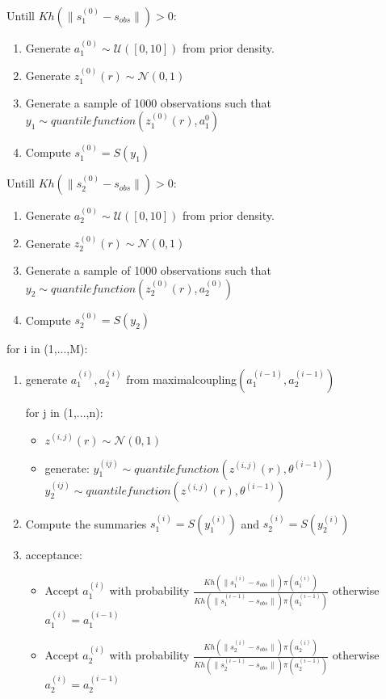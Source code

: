 \documentclass{article}
\begin{document}
Untill $Kh(\|s_{1}^{(0)} - s_{obs}\|)>0$:
\begin{enumerate}
	\item Generate $a_{1}^{(0)} \sim \mathcal{U}([0,10])$ from prior density.
	\item Generate $z_{1}^{(0)}(r) \sim \mathcal{N}(0,1)$
	\item Generate a sample of 1000 observations such that $y_{1} \sim quantile function(z_{1}^{(0)}(r),a_{1}^{0})$
	\item Compute $s_{1}^{(0)}=S(y_{1})$
	
\end{enumerate}
Untill $Kh(\|s_{2}^{(0)} - s_{obs}\|)>0$:
\begin{enumerate}
	\item Generate $a_{2}^{(0)} \sim \mathcal{U}([0,10])$ from prior density.
	\item Generate $z_{2}^{(0)}(r) \sim \mathcal{N}(0,1)$
	\item Generate a sample of 1000 observations such that $y_{2} \sim quantile function(z_{2}^{(0)}(r),a_{2}^{(0)})$
	\item Compute $s_{2}^{(0)}=S(y_{2})$
\end{enumerate}


for i in (1,...,M):
\begin{enumerate}
	\item 	generate $a_{1}^{(i)},a_{2}^{(i)}$  from maximalcoupling$(a_{1}^{(i-1)},a_{2}^{(i-1)})$

		for j in (1,...,n):
		\begin{itemize}
			\item $z^{(i,j)}(r) \sim \mathcal{N}(0,1)$
			\item generate:
			$ y_{1}^{(ij)} \sim quantile function(z^{(i,j)}(r), \theta^{(i-1)})$
			$ y_{2}^{(ij)} \sim quantile function(z^{(i,j)}(r), \theta^{(i-1)})$
			
		\end{itemize}

	\item Compute the summaries  $ s_{1}^{(i)} =S(y_{1}^{(i)})$ and $ s_{2}^{(i)} =S(y_{2}^{(i)})$
	
	
	\item acceptance:
	\begin{itemize}
		\item Accept $a_{1}^{(i)}$ with probability $\frac{Kh(\|s_{1}^{(i)}-s_{obs}\|)\pi(a_{1}^{(i)})}{Kh(\|s_{1}^{(i-1)}- s_{obs}\|)\pi(a_{1}^{(i-1)})} $   otherwise $a_{1}^{(i)}=a_{1}^{(i-1)}$
		
		\item Accept $a_{2}^{(i)}$ with probability $\frac{Kh(\|s_{2}^{(i)}-s_{obs}\|)\pi(a_{2}^{(i)})}{Kh(\|s_{2}^{(i-1)}-s_{obs}\|)\pi(a_{2}^{(i-1)})} $  otherwise $  a_{2}^{(i)}=a_{2}^{(i-1)}$
	\end{itemize}
\end{enumerate}
\end{document}
